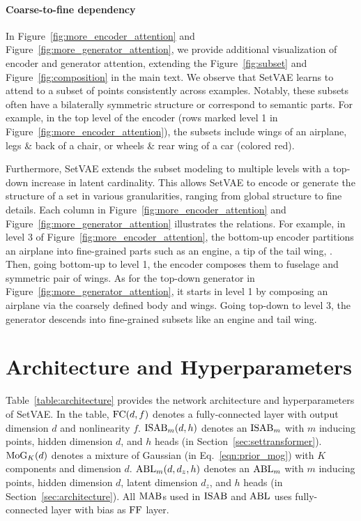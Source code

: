 \documentclass[final]{arxiv/cvpr}
\begin{document}
\paragraph{Coarse-to-fine dependency}
In Figure~\ref{fig:more_encoder_attention} and Figure~\ref{fig:more_generator_attention}, we provide additional visualization of encoder and generator attention, extending the Figure~\ref{fig:subset} and Figure~\ref{fig:composition} in the main text.
We observe that SetVAE learns to attend to a subset of points consistently across examples.
Notably, these subsets often have a bilaterally symmetric structure or correspond to semantic parts.
For example, in the top level of the encoder (rows marked level 1 in Figure~\ref{fig:more_encoder_attention}), the subsets include wings of an airplane, legs \& back of a chair, or wheels \& rear wing of a car (colored red).

Furthermore, SetVAE extends the subset modeling to multiple levels with a top-down increase in latent cardinality.
This allows SetVAE to encode or generate the structure of a set in various granularities, ranging from global structure to fine details.
Each column in Figure~\ref{fig:more_encoder_attention} and Figure~\ref{fig:more_generator_attention} illustrates the relations.
For example, in level 3 of Figure~\ref{fig:more_encoder_attention}, the bottom-up encoder partitions an airplane into fine-grained parts such as an engine, a tip of the tail wing, \etc.
Then, going bottom-up to level 1, the encoder composes them to fuselage and symmetric pair of wings.
As for the top-down generator in Figure~\ref{fig:more_generator_attention}, it starts in level 1 by composing an airplane via the coarsely defined body and wings.
Going top-down to level 3, the generator descends into fine-grained subsets like an engine and tail wing.

\section{Architecture and Hyperparameters}
\label{appendix:training}
Table~\ref{table:architecture} provides the network architecture and hyperparameters of SetVAE.
In the table, $\textnormal{FC}(d, f)$ denotes a fully-connected layer with output dimension $d$ and nonlinearity $f$.
$\textnormal{ISAB}_m(d, h)$ denotes an $\textnormal{ISAB}_m$ with $m$ inducing points, hidden dimension $d$, and $h$ heads (in Section~\ref{sec:settransformer}).
$\textnormal{MoG}_K(d)$ denotes a mixture of Gaussian (in Eq.~\eqref{eqn:prior_mog}) with $K$ components and dimension $d$.
$\textnormal{ABL}_m(d, d_z, h)$ denotes an $\textnormal{ABL}_m$ with $m$ inducing points, hidden dimension $d$, latent dimension $d_z$, and $h$ heads (in Section~\ref{sec:architecture}).
All $\textnormal{MAB}$s used in $\textnormal{ISAB}$ and $\textnormal{ABL}$ uses fully-connected layer with bias as $\textnormal{FF}$ layer.
\end{document}
